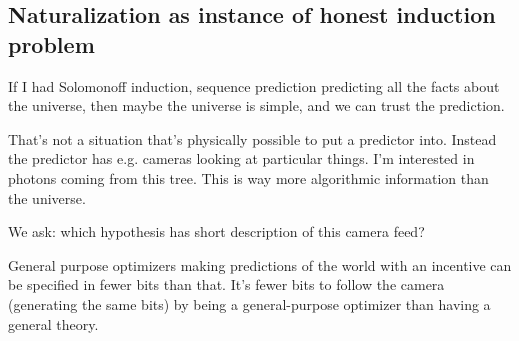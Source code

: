 \documentclass[11pt]{article}
\begin{document}





\subsection{Naturalization as instance of honest induction problem}

If I had Solomonoff induction, sequence prediction predicting all the facts about the universe, then maybe the universe is simple, and we can trust the prediction.

That's not a situation that's physically possible to put a predictor into. Instead the predictor has e.g. cameras looking at particular things. I'm interested in photons coming from this tree. This is way more algorithmic information than the universe.

We ask: which hypothesis has short description of %
 this camera feed?


General purpose optimizers making predictions of the world with an incentive can be specified in fewer bits than that. %
It's fewer bits to follow the camera (generating the same bits) by being a general-purpose optimizer than having a general theory.






\end{document}
